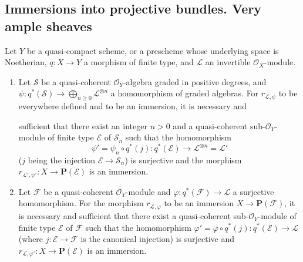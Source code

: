 \subsection{Immersions into projective bundles. Very ample sheaves}
\label{subsection:II.4.4}

\begin{proposition}[4.4.1]
\label{II.4.4.1}
Let $Y$ be a quasi-compact scheme, or a prescheme whose underlying space
is Noetherian, $q:X\to Y$ a morphism of finite type, and $\mathcal{L}$ an
invertible $\mathcal{O}_X$-module.
\begin{enumerate}
  \item[\rm{(i)}] Let $\mathcal{S}$ be a quasi-coherent $\mathcal{O}_Y$-algebra
  graded in positive degrees, and
  $\psi:q^*(\mathcal{S})\to\bigoplus_{n\geq0}\mathcal{L}^{\otimes n}$ a
  homomorphism of graded algebras. For $r_{\mathcal{L},\psi}$ to be
  everywhere defined and to be an immersion, it is necessary and


  sufficient that there exist an integer $n>0$ and a quasi-coherent
  sub-$\mathcal{O}_Y$-module of finite type $\mathcal{E}$ of $\mathcal{S}_n$
  such that the homomorphism
  \[
    \psi'=\psi_n\circ q^*(j):q^*(\mathcal{E})
      \longrightarrow\mathcal{L}^{\otimes n}=\mathcal{L}'
  \]
  ($j$ being the injection $\mathcal{E}\to\mathcal{S}_n$) is surjective and
  the morphism
  $r_{\mathcal{L}',\psi'}:X\to\mathbf{P}(\mathcal{E})$ is an immersion.
  \item[\rm{(ii)}] Let $\mathcal{F}$ be a quasi-coherent
  $\mathcal{O}_Y$-module and $\varphi:q^*(\mathcal{F})\to\mathcal{L}$ a
  surjective homomorphism. For the morphism $r_{\mathcal{L},\varphi}$ to be an
  immersion $X\to\mathbf{P}(\mathcal{F})$, it is necessary and sufficient that
  there exist a quasi-coherent sub-$\mathcal{O}_Y$-module of finite type
  $\mathcal{E}$ of $\mathcal{F}$ such that the homomorphism
  $\varphi'=\varphi\circ q^*(j):q^*(\mathcal{E})\to\mathcal{L}$ (where
  $j:\mathcal{E}\to\mathcal{F}$ is the canonical injection) is surjective and
  $r_{\mathcal{L},\varphi'}:X\to\mathbf{P}(\mathcal{E})$ is an
  immersion.
\end{enumerate}
\end{proposition}

